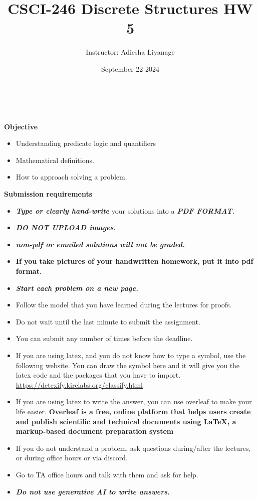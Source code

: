 \documentclass[12pt]{exam}
\title{CSCI-246 Discrete Structures HW 5}
\author{Instructor: Adiesha Liyanage}
\date{September 22 2024}
\begin{document}
\maketitle

\hrulefill
\\
\\
\textbf{Objective}
\begin{itemize}
    \item Understanding predicate logic and quantifiers
    \item Mathematical definitions.
    \item How to approach solving a problem.
\end{itemize}

\textbf{Submission requirements}
\begin{itemize}
    \item \textbf{\textit{Type or clearly hand-write}} your solutions into a \textbf{\textit{PDF FORMAT.}} 
    \item \textbf{\textit{DO NOT UPLOAD images.}}
    \item \textbf{\textit{non-pdf or emailed solutions will not be graded.}}
    \item \textbf{If you take pictures of your handwritten homework, put it into pdf format.}
    \item \textbf{\textit{Start each problem on a new page.}}
    \item Follow the model that you have learned during the lectures for proofs.
    \item Do not wait until the last minute to submit the assignment.
    \item You can submit any number of times before the deadline. 
    \item If you are using latex, and you do not know how to type a symbol, use the following website. You can draw the symbol here and it will give you the latex code and the packages that you have to import. \url{https://detexify.kirelabs.org/classify.html}
    \item If you are using latex to write the answer, you can use overleaf to make your life easier. \textbf{Overleaf is a free, online platform that helps users create and publish scientific and technical documents using LaTeX, a markup-based document preparation system}
    \item If you do not understand a problem, ask questions during/after the lectures, or during office hours or via discord.
    \item Go to TA office hours and talk with them and ask for help.
    \item \textbf{\textit{Do not use generative AI to write answers.}} 
\end{itemize}
\end{document}
